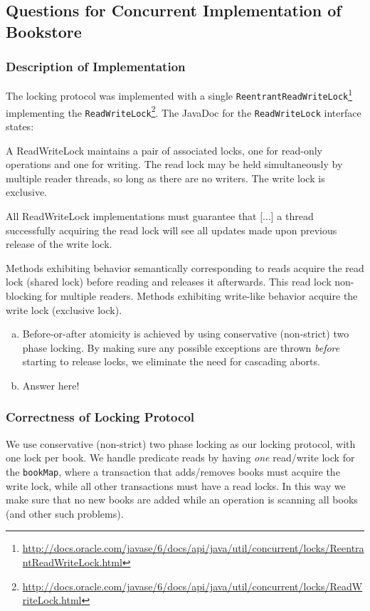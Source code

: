 \documentclass[11pt,a4paper,english]{article}
\begin{document}
\subsection{Questions for Concurrent Implementation of Bookstore}
\subsubsection{Description of Implementation}
The locking protocol was implemented with a single \texttt{ReentrantReadWriteLock}\footnote{\url{http://docs.oracle.com/javase/6/docs/api/java/util/concurrent/locks/ReentrantReadWriteLock.html}} implementing the  \texttt{ReadWriteLock}\footnote{\url{http://docs.oracle.com/javase/6/docs/api/java/util/concurrent/locks/ReadWriteLock.html}}. The JavaDoc for the \texttt{ReadWriteLock} interface  states:

\begin{displayquote}
A ReadWriteLock maintains a pair of associated locks, one for read-only operations and one for writing. The read lock may be held simultaneously by multiple reader threads, so long as there are no writers. The write lock is exclusive.

All ReadWriteLock implementations must guarantee that [...] a thread successfully acquiring the read lock will see all updates made upon previous release of the write lock.
\end{displayquote}
Methods exhibiting behavior semantically corresponding to reads acquire the read lock (shared lock) before reading and releases it afterwards. This read lock non-blocking for multiple readers. Methods exhibiting write-like behavior acquire the write lock (exclusive lock).
\begin{enumerate}[(a)]
\item Before-or-after atomicity is achieved by using conservative (non-strict)
  two phase locking. By making sure any possible exceptions are thrown
  \emph{before} starting to release locks, we eliminate the need for cascading
  aborts.
\item{Answer here!}
\end{enumerate}

\subsubsection{Correctness of Locking Protocol}

We use conservative (non-strict) two phase locking as our locking protocol, with
one lock per book. We handle predicate reads by having \emph{one} read/write
lock for the \texttt{bookMap}, where a transaction that adds/removes books must
acquire the write lock, while all other transactions must have a read locks. In
this way we make sure that no new books are added while an operation is scanning
all books (and other such problems).
\end{document}

